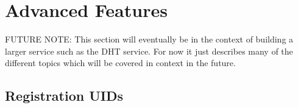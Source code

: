 % 
% 
% 
% 
% 
% 
\section{Advanced Features}
\label{sec:advanced}


FUTURE NOTE: This section will eventually be in the context of building a
larger service such as the DHT service.  For now it just describes many of the
different topics which will be covered in context in the future.

\subsection{Registration UIDs}
\label{sec:reguid}

